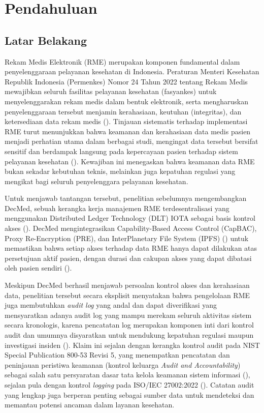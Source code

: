 \chapter{Pendahuluan}
\label{ch:pendahuluan}

\section{Latar Belakang}
\label{sec:latar-belakang}

Rekam Medis Elektronik (RME) merupakan komponen fundamental dalam penyelenggaraan pelayanan kesehatan di Indonesia. Peraturan Menteri Kesehatan Republik Indonesia (Permenkes) Nomor 24 Tahun 2022 tentang Rekam Medis mewajibkan seluruh fasilitas pelayanan kesehatan (fasyankes) untuk menyelenggarakan rekam medis dalam bentuk elektronik, serta mengharuskan penyelenggaraan tersebut menjamin kerahasiaan, keutuhan (integritas), dan ketersediaan data rekam medis (\cite{permenkes24_2022}). Tinjauan sistematis terhadap implementasi RME turut menunjukkan bahwa keamanan dan kerahasiaan data medis pasien menjadi perhatian utama dalam berbagai studi, mengingat data tersebut bersifat sensitif dan berdampak langsung pada kepercayaan pasien terhadap sistem pelayanan kesehatan (\cite{pramesti2024keamanan}). Kewajiban ini menegaskan bahwa keamanan data RME bukan sekadar kebutuhan teknis, melainkan juga kepatuhan regulasi yang mengikat bagi seluruh penyelenggara pelayanan kesehatan.

Untuk menjawab tantangan tersebut, penelitian sebelumnya mengembangkan DecMed, sebuah kerangka kerja manajemen RME terdesentralisasi yang menggunakan Distributed Ledger Technology (DLT) IOTA sebagai basis kontrol akses (\cite{DecMed}). DecMed mengintegrasikan Capability-Based Access Control (CapBAC), Proxy Re-Encryption (PRE), dan InterPlanetary File System (IPFS) (\cite{benet2014ipfscontentaddressed}) untuk memastikan bahwa setiap akses terhadap data RME hanya dapat dilakukan atas persetujuan aktif pasien, dengan durasi dan cakupan akses yang dapat dibatasi oleh pasien sendiri (\cite{DecMed}).

Meskipun DecMed berhasil menjawab persoalan kontrol akses dan kerahasiaan data, penelitian tersebut secara eksplisit menyatakan bahwa pengelolaan RME juga membutuhkan \textit{audit log} yang andal dan dapat diverifikasi yang mensyaratkan adanya audit log yang mampu merekam seluruh aktivitas sistem secara kronologis, karena pencatatan log merupakan komponen inti dari kontrol audit dan umumnya disyaratkan untuk mendukung kepatuhan regulasi maupun investigasi insiden (\cite{DecMed}). Klaim ini sejalan dengan kerangka kontrol audit pada NIST Special Publication 800-53 Revisi 5, yang menempatkan pencatatan dan peninjauan peristiwa keamanan (kontrol keluarga \textit{Audit and Accountability}) sebagai salah satu persyaratan dasar tata kelola keamanan sistem informasi (\cite{nist80053r5}), sejalan pula dengan kontrol \textit{logging} pada ISO/IEC 27002:2022 (\cite{iso27002_2022}). Catatan audit yang lengkap juga berperan penting sebagai sumber data untuk mendeteksi dan memantau potensi ancaman dalam layanan kesehatan.

